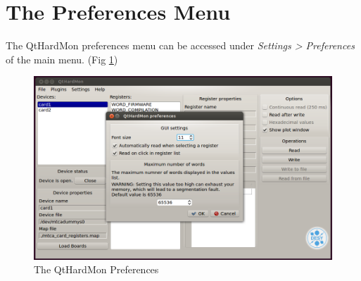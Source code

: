 \begin{enumerate}

\end{enumerate}


\section{The Preferences Menu}\label{preference_section} 
The QtHardMon preferences menu can be accessed under 
\textit{Settings > Preferences} of the main menu. (Fig \ref{qthardmon_preferences})

\begin{figure}[htbp] 
	\centering
    \includegraphics[width=1\textwidth]{images/preferences.png} \caption{The
    QtHardMon Preferences} \label{qthardmon_preferences}			\end{figure}

